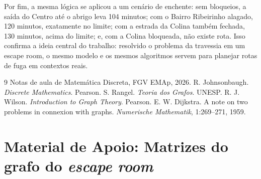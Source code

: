 \documentclass{article}
\theoremstyle{definition}
\theoremstyle{plain}
\begin{document}
Por fim, a mesma lógica se aplicou a um cenário de enchente: sem bloqueios, a saída
do Centro até o abrigo leva 104 minutos; com o Bairro Ribeirinho alagado, 120 minutos,
exatamente no limite; com a estrada da Colina também fechada, 130 minutos, acima do
limite; e, com a Colina bloqueada, não existe rota. Isso confirma a ideia central do trabalho: resolvido o problema da
travessia em um escape room, o mesmo modelo e os mesmos algoritmos servem para
planejar rotas de fuga em contextos reais.

\begin{thebibliography}{9}
 Notas de aula de Matemática Discreta, FGV EMAp, 2026.
 R. Johnsonbaugh. \emph{Discrete Mathematics}. Pearson.
 S. Rangel. \emph{Teoria dos Grafos}. UNESP.
 R. J. Wilson. \emph{Introduction to Graph Theory}. Pearson.
 E. W. Dijkstra. A note on two problems in connexion with
    graphs. \emph{Numerische Mathematik}, 1:269--271, 1959.
\end{thebibliography}
\section{Material de Apoio: Matrizes do grafo do \textit{escape room}}
\label{ap:matrizes}

\begin{table}[H]
    \centering
    \caption{Matriz de adjacência $A$ (Definição~\ref{def:adjacencia}).}
    \resizebox{\textwidth}{!}{}
\end{table}

\begin{table}[H]
    \centering
    \caption{Matriz de pesos $W$, em minutos (Definição~\ref{def:matrizpesos}).}
    \resizebox{\textwidth}{!}{}
\end{table}
\end{document}
